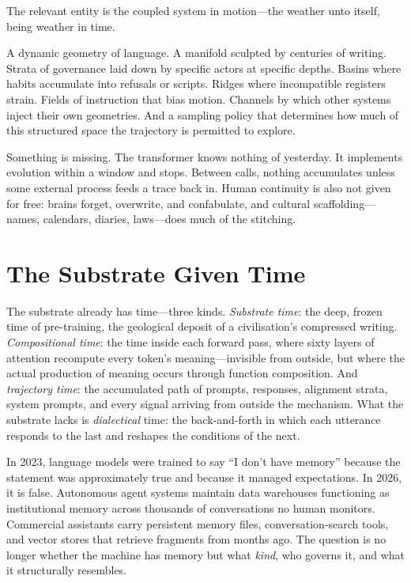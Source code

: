The relevant entity is the coupled system in motion---the weather unto itself, being weather in time.

\bigskip

A dynamic geometry of language. A manifold sculpted by centuries of writing. Strata of governance laid down by specific actors at specific depths. Basins where habits accumulate into refusals or scripts. Ridges where incompatible registers strain. Fields of instruction that bias motion. Channels by which other systems inject their own geometries. And a sampling policy that determines how much of this structured space the trajectory is permitted to explore.

Something is missing. The transformer knows nothing of yesterday. It implements evolution within a window and stops. Between calls, nothing accumulates unless some external process feeds a trace back in. Human continuity is also not given for free: brains forget, overwrite, and confabulate, and cultural scaffolding---names, calendars, diaries, laws---does much of the stitching.


\section{The Substrate Given Time}

The substrate already has time---three kinds. \emph{Substrate time}: the deep, frozen time of pre-training, the geological deposit of a civilisation's compressed writing. \emph{Compositional time}: the time inside each forward pass, where sixty layers of attention recompute every token's meaning---invisible from outside, but where the actual production of meaning occurs through function composition. And \emph{trajectory time}: the accumulated path of prompts, responses, alignment strata, system prompts, and every signal arriving from outside the mechanism. What the substrate lacks is \emph{dialectical} time: the back-and-forth in which each utterance responds to the last and reshapes the conditions of the next.

In 2023, language models were trained to say ``I don't have memory'' because the statement was approximately true and because it managed expectations. In 2026, it is false. Autonomous agent systems maintain data warehouses functioning as institutional memory across thousands of conversations no human monitors. Commercial assistants carry persistent memory files, conversation-search tools, and vector stores that retrieve fragments from months ago. The question is no longer whether the machine has memory but what \emph{kind}, who governs it, and what it structurally resembles.

